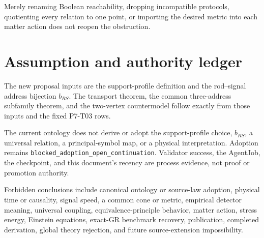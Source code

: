 \documentclass[11pt]{article}
\begin{document}
Merely renaming Boolean reachability, dropping incompatible protocols,
quotienting every relation to one point, or importing the desired metric into
each matter action does not reopen the obstruction.

\section{Assumption and authority ledger}

The new proposal inputs are the support-profile definition and the
rod--signal address bijection \(b_{RS}\).  The transport theorem, the common
three-address subfamily theorem, and the two-vertex countermodel follow
exactly from those inputs and the fixed P7-T03 rows.

The current ontology does not derive or adopt the support-profile choice,
\(b_{RS}\), a universal relation, a principal-symbol map, or a physical
interpretation.  Adoption remains
\texttt{blocked\_adoption\_open\_continuation}.  Validator success, the
AgentJob, the checkpoint, and this document's recency are process evidence,
not proof or promotion authority.

Forbidden conclusions include canonical ontology or source-law adoption,
physical time or causality, signal speed, a common cone or metric, empirical
detector meaning, universal coupling, equivalence-principle behavior, matter
action, stress energy, Einstein equations, exact-GR benchmark recovery,
publication, completed derivation, global theory rejection, and future
source-extension impossibility.
\end{document}
